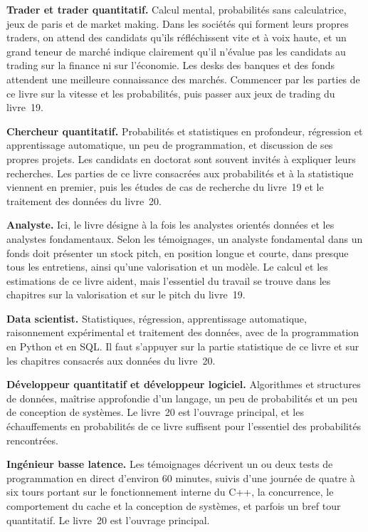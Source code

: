 \textbf{Trader et trader quantitatif.} Calcul mental, probabilités sans calculatrice, jeux de paris et de market making. Dans les sociétés qui forment leurs propres traders, on attend des candidats qu'ils réfléchissent vite et à voix haute, et un grand teneur de marché indique clairement qu'il n'évalue pas les candidats au trading sur la finance ni sur l'économie. Les desks des banques et des fonds attendent une meilleure connaissance des marchés. Commencer par les parties de ce livre sur la vitesse et les probabilités, puis passer aux jeux de trading du livre~19.

\textbf{Chercheur quantitatif.} Probabilités et statistiques en profondeur, régression et apprentissage automatique, un peu de programmation, et discussion de ses propres projets. Les candidats en doctorat sont souvent invités à expliquer leurs recherches. Les parties de ce livre consacrées aux probabilités et à la statistique viennent en premier, puis les études de cas de recherche du livre~19 et le traitement des données du livre~20.

\textbf{Analyste.} Ici, le livre désigne à la fois les analystes orientés données et les analystes fondamentaux. Selon les témoignages, un analyste fondamental dans un fonds doit présenter un stock pitch, en position longue et courte, dans presque tous les entretiens, ainsi qu'une valorisation et un modèle. Le calcul et les estimations de ce livre aident, mais l'essentiel du travail se trouve dans les chapitres sur la valorisation et sur le pitch du livre~19.

\textbf{Data scientist.} Statistiques, régression, apprentissage automatique, raisonnement expérimental et traitement des données, avec de la programmation en Python et en SQL. Il faut s'appuyer sur la partie statistique de ce livre et sur les chapitres consacrés aux données du livre~20.

\textbf{Développeur quantitatif et développeur logiciel.} Algorithmes et structures de données, maîtrise approfondie d'un langage, un peu de probabilités et un peu de conception de systèmes. Le livre~20 est l'ouvrage principal, et les échauffements en probabilités de ce livre suffisent pour l'essentiel des probabilités rencontrées.

\textbf{Ingénieur basse latence.} Les témoignages décrivent un ou deux tests de programmation en direct d'environ 60 minutes, suivis d'une journée de quatre à six tours portant sur le fonctionnement interne du C++, la concurrence, le comportement du cache et la conception de systèmes, et parfois un bref tour quantitatif. Le livre~20 est l'ouvrage principal.

